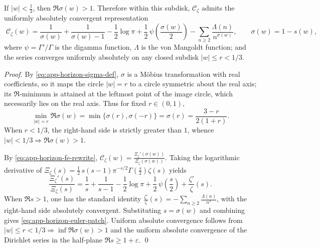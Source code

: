 \begin{theorem}\label{thm:app-horizon-euler-patch}
If \(|w|<\frac13\), then \(\Re\sigma(w)>1\).
Therefore within this subdisk, \(\mathscr{C}_{\zeta}\) admits the uniformly absolutely convergent representation
\begin{equation}\label{eq:app-horizon-euler-patch}
\boxed{\;
\mathscr{C}_{\zeta}(w)=\frac{1}{\sigma(w)}+\frac{1}{\sigma(w)-1}
-\frac12\log\pi+\frac12\,\psi\!\left(\frac{\sigma(w)}{2}\right)
-\sum_{n\ge2}\frac{\Lambda(n)}{n^{\sigma(w)}},\qquad \sigma(w)=1-s(w),\;}
\end{equation}
where \(\psi=\Gamma'/\Gamma\) is the digamma function, \(\Lambda\) is the von Mangoldt function; and the series converges uniformly absolutely on any closed subdisk \(|w|\le r<1/3\).
\end{theorem}

\begin{proof}
By \eqref{eq:app-horizon-sigma-def}, \(\sigma\) is a M\"obius transformation with real coefficients, so it maps the circle \(|w|=r\) to a circle symmetric about the real axis; its \(\Re\)-minimum is attained at the leftmost point of the image circle, which necessarily lies on the real axis.
Thus for fixed \(r\in(0,1)\),
\[
\min_{|w|=r}\Re\sigma(w)=\min\{\sigma(r),\sigma(-r)\}=\sigma(r)=\frac{3-r}{2(1+r)}.
\]
When \(r<1/3\), the right-hand side is strictly greater than \(1\), whence \(|w|<1/3\Rightarrow \Re\sigma(w)>1\).
\par
By \eqref{eq:app-horizon-fe-rewrite}, \(\mathscr{C}_{\zeta}(w)=\frac{\Xi_{\zeta}'(\sigma(w))}{\Xi_{\zeta}(\sigma(w))}\).
Taking the logarithmic derivative of \(\Xi_{\zeta}(s)=\frac12\,s(s-1)\pi^{-s/2}\Gamma(\tfrac{s}{2})\zeta(s)\) yields
\[
\frac{\Xi_{\zeta}'(s)}{\Xi_{\zeta}(s)}
=\frac{1}{s}+\frac{1}{s-1}-\frac12\log\pi+\frac12\,\psi\!\left(\frac{s}{2}\right)+\frac{\zeta'}{\zeta}(s).
\]
When \(\Re s>1\), one has the standard identity
\(
\frac{\zeta'}{\zeta}(s)=-\sum_{n\ge 2}\frac{\Lambda(n)}{n^s}
\),
with the right-hand side absolutely convergent.
Substituting \(s=\sigma(w)\) and combining gives \eqref{eq:app-horizon-euler-patch}.
Uniform absolute convergence follows from \(|w|\le r<1/3\Rightarrow \inf\Re\sigma(w)>1\) and the uniform absolute convergence of the Dirichlet series in the half-plane \(\Re s\ge 1+\varepsilon\). \qed
\end{proof}

